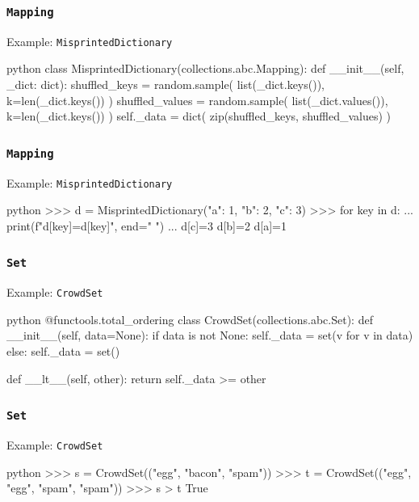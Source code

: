 \documentclass[aspectratio=169,dvipdfmx,12pt,notheorems]{beamer}
\theoremstyle{definition}
\begin{document}
\begin{frame}[fragile]\frametitle{\texttt{Mapping}}

\begin{exampleblock}{Example: \texttt{MisprintedDictionary}}
\begin{pygments}{python}
class MisprintedDictionary(collections.abc.Mapping):
    def __init__(self, _dict: dict):
        shuffled_keys = random.sample(
            list(_dict.keys()), k=len(_dict.keys())
        )
        shuffled_values = random.sample(
            list(_dict.values()), k=len(_dict.keys())
        )
        self._data = dict(
            zip(shuffled_keys, shuffled_values)
        )
\end{pygments}
\end{exampleblock}

\end{frame}

\begin{frame}[fragile]\frametitle{\texttt{Mapping}}

\begin{exampleblock}{Example: \texttt{MisprintedDictionary}}
\begin{pygments}{python}
>>> d = MisprintedDictionary({"a": 1, "b": 2, "c": 3})
>>> for key in d:
...     print(f"d[{key}]={d[key]}", end=" ")
...
d[c]=3 d[b]=2 d[a]=1
\end{pygments}
\end{exampleblock}

\end{frame}

\begin{frame}[fragile]\frametitle{\texttt{Set}}

\begin{exampleblock}{Example: \texttt{CrowdSet}}
\begin{pygments}{python}
@functools.total_ordering
class CrowdSet(collections.abc.Set):
    def __init__(self, data=None):
        if data is not None:
            self._data = set(v for v in data)
        else:
            self._data = set()

    def __lt__(self, other):
        return self._data >= other
\end{pygments}
\end{exampleblock}

\end{frame}

\begin{frame}[fragile]\frametitle{\texttt{Set}}

\begin{exampleblock}{Example: \texttt{CrowdSet}}
\begin{pygments}{python}
>>> s = CrowdSet(("egg", "bacon", "spam"))
>>> t = CrowdSet(("egg", "egg", "spam", "spam"))
>>> s > t
True
\end{pygments}
\end{exampleblock}

\end{frame}
\end{document}
